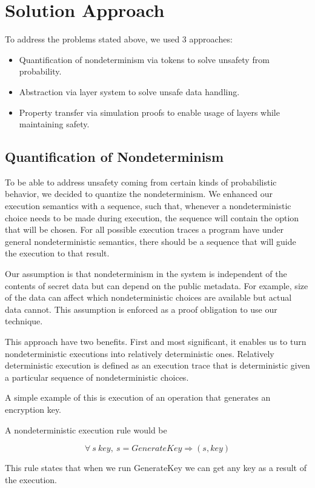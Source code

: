 
\section{Solution Approach}
To address the problems stated above, we used 3 approaches:
\begin{itemize}
	\item Quantification of nondeterminism via tokens to solve unsafety from probability.
	\item Abstraction via layer system to solve unsafe data handling.
	\item Property transfer via simulation proofs to enable usage of layers while maintaining safety.
\end{itemize}


\subsection{Quantification of Nondeterminism}
To be able to address unsafety coming from certain kinds of probabilistic behavior, we decided to quantize the nondeterminism. We enhanced our execution semantics with a sequence, such that, whenever a nondeterministic choice needs to be made during execution, the sequence will contain the option that will be chosen. For all possible execution traces a program have under general nondeterministic semantics, there should be a sequence that will guide the execution to that result. 

Our assumption is that nondeterminism in the system is independent of the contents of secret data but can depend on the public metadata. For example, size of the data can affect which nondeterministic choices are available but actual data cannot. This assumption is enforced as a proof obligation to use our technique.

This approach have two benefits. First and most significant, it enables us to
turn nondeterministic executions into relatively deterministic ones. 
Relatively deterministic execution is defined as an execution trace that is 
deterministic given a particular sequence of nondeterministic choices.

A simple example of this is execution of an operation that generates an encryption key. 

A nondeterministic execution rule would be

$$\forall\ s\ key,\ s  =GenerateKey\Rightarrow (s, key)$$ 

This rule states that when we run GenerateKey we can get any key as a result of the execution.


